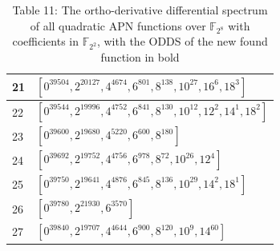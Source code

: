 \documentclass[10pt]{article}
\begin{document}
\begin{table}[h]
\begin{center}
\begin{tabular}{|l|l|}
\hline
21 & $\left[0^{39504}, 2^{20127}, 4^{4674}, 6^{801}, 8^{138}, 10^{27}, 16^{6}, 18^{3}\right]$ \\
\hline
22 & $\left[0^{39544}, 2^{19996}, 4^{4752}, 6^{841}, 8^{130}, 10^{12}, 12^{2}, 14^{1}, 18^{2}\right]$ \\
\hline
23 & $\left[0^{39600}, 2^{19680}, 4^{5220}, 6^{600}, 8^{180}\right]$ \\
\hline
24 & $\left[0^{39692}, 2^{19752}, 4^{4756}, 6^{978}, 8^{72}, 10^{26}, 12^{4}\right]$ \\
\hline
25 & $\left[0^{39750}, 2^{19641}, 4^{4876}, 6^{845}, 8^{136}, 10^{29}, 14^{2}, 18^{1}\right]$ \\
\hline
26 & $\left[0^{39780}, 2^{21930}, 6^{3570}\right]$ \\
\hline
27 & $\left[0^{39840}, 2^{19707}, 4^{4644}, 6^{900}, 8^{120}, 10^{9}, 14^{60}\right]$ \\
\hline
\end{tabular}
\captionsetup{labelformat=empty}
\caption{Table 11: The ortho-derivative differential spectrum of all quadratic APN functions over $\mathbb{F}_{2^{8}}$ with coefficients in $\mathbb{F}_{2^{2}}$, with the ODDS of the new found function in bold}
\end{center}
\end{table}
\end{document}
